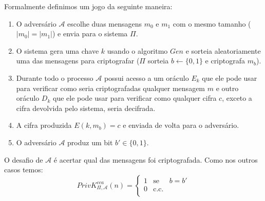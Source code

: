 Formalmente definimos um jogo da seguinte maneira:
\begin{enumerate}
\item O adversário $\mathcal{A}$ escolhe duas mensagens $m_0$ e $m_1$ com o mesmo tamanho ($|m_0| = |m_1|$) e envia para o sistema $\Pi$.
\item O sistema gera uma chave $k$ usando o algoritmo $Gen$ e sorteia aleatoriamente uma das mensagens para criptografar ($\Pi$ sorteia $b \leftarrow \{0, 1\}$ e criptografa $m_b$).
\item Durante todo o processo $\mathcal{A}$ possui acesso a um oráculo $E_k$ que ele pode usar para verificar como seria criptografadas qualquer mensagem $m$ e outro oráculo $D_k$ que ele pode usar para verificar como qualquer cifra $c$, exceto a cifra devolvida pelo sistema, seria decifrada.
\item A cifra produzida $E(k, m_b) = c$ e enviada de volta para o adversário.
\item O adversário $\mathcal{A}$ produz um bit $b' \in \{0,1\}$.
\end{enumerate}

\begin{center}
\end{center}


O desafio de $\mathcal{A}$ é acertar qual das mensagens foi criptografada.
Como nos outros casos temos:
\begin{displaymath}
  PrivK^{cca}_{\Pi, \mathcal{A}}(n) = \left\{
    \begin{array}{lcl}
      1 & \textrm{se} & b = b'\\
      0 & \textrm{c.c.} &\\
    \end{array}
    \right.
\end{displaymath}

